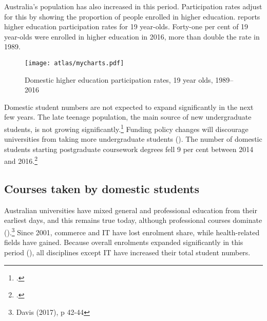 \documentclass{grattan}
\begin{document}
Australia's population has also increased in this period. Participation rates adjust for this by showing the proportion of people enrolled in higher education.  reports higher education participation rates for 19 year-olds. Forty-one per cent of 19 year-olds were enrolled in higher education in 2016, more than double the rate in 1989.


    \begin{figure} %
    \caption{Domestic higher education participation rates, 19 year olds, 1989--2016}\label{fig:domestic-higher-education-participation-rates-19-year-olds-19892016}
    \texttt{[image: atlas/mycharts.pdf]}
    \end{figure}



Domestic student numbers are not expected to expand significantly in the next few years. The late teenage population, the main source of new undergraduate students, is not growing significantly.\footcite[][]{ABS2018australiandemograp} Funding policy changes will discourage universities from taking more undergraduate students (). The number of domestic students starting postgraduate coursework degrees fell 9 per cent between 2014 and 2016.\footcite[][]{DepartmentofEducationandTraining2018ucubehighereduc}

%
\subsection{Courses taken by domestic students}\label{subsec:courses-taken-by-domestic-students}

Australian universities have mixed general and professional education from their earliest days, and this remains true today, although professional courses dominate ().\footnote{Davis (2017), p 42-44} Since 2001, commerce and IT have lost enrolment share, while health-related fields have gained. Because overall enrolments expanded significantly in this period (), all disciplines except IT have increased their total student numbers.
\end{document}
